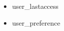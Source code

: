 \documentclass[a4paper, 14pt]{extarticle}
\begin{document}
\begin{itemize}
\begin{itemize}
            \item user\_lastaccess
            \item user\_preference

\end{itemize}
\end{itemize}
\end{document}
